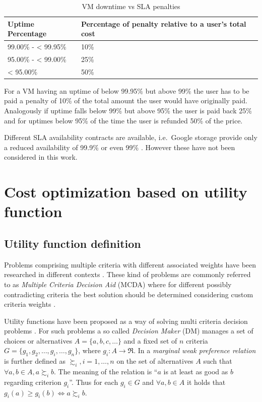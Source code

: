 \begin{table}[htbp]
\centering
\begin{tabular}{ll}
  \hline
	Uptime Percentage & Percentage of penalty relative to a user's total cost	 \\
  \hline
	99.00\% - < 99.95\%	& 10\% \\
	95.00\% - < 99.00\%	& 25\% \\
	< 95.00\%				& 50\% \\
   \hline
\end{tabular}
\caption{VM downtime vs SLA penalties}
\label{tab:sla_penalties}
\end{table}


For a VM having an uptime of below 99.95\% but above 99\% the user has to be paid a penalty of 10\% of the total amount the user would have originally paid. Analogously if uptime falls below 99\% but above 95\% the user is paid back 25\% and for uptimes below 95\% of the time the user is refunded 50\% of the price. 

Different SLA availability contracts are available, i.e.~Google storage provide only a reduced availability of 99.9\% or even 99\% \cite{google2015storage}. However these have not been considered in this work. 

\section{Cost optimization based on utility function} \label{sec:cost_optimization_based_on_utility_function}

\subsection{Utility function definition}

Problems comprising multiple criteria with different associated weights have been researched in different contexts \cite{angilella2004assessing, dulmin2003supplier}. These kind of problems are commonly referred to as \textit{Multiple Criteria Decision Aid} (MCDA) where for different possibly contradicting criteria the best solution should be determined considering custom criteria weights \cite{dulmin2003supplier}. 

Utility functions have been proposed as a way of solving multi criteria decision problems \cite{angilella2004assessing, afriat1967construction}. 
For such problems a so called \textit{Decision Maker} (DM) manages a set of choices or alternatives $A = \{a,b,c,\ldots\}$ and a fixed set of $n$ criteria $G = \{g_1,g_2,\ldots,g_i,\ldots,g_n\}$, where $g_i : A \rightarrow \mathfrak{R}$. 
In \cite{angilella2004assessing} a \textit{marginal weak preference relation} is further defined as $\succsim_i, i = 1,\ldots,n$ on the set of alternatives $A$ such that $\forall a,b \in A, a \succsim_i b$. The meaning of the relation is ``$a$ is at least as good as $b$ regarding criterion $g_i$''. 
Thus for each $g_i \in G$ and $\forall a,b \in A$ it holds that $g_i(a) \geq g_i(b) \Leftrightarrow a \succsim_i b$. 

